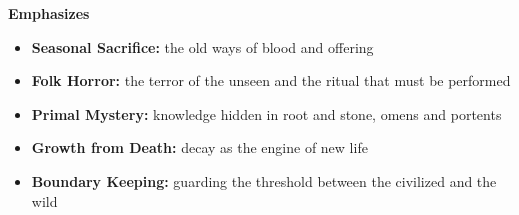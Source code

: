 \noindent\textbf{Emphasizes}
\begin{itemize}
  \item \textbf{Seasonal Sacrifice:} the old ways of blood and offering
  \item \textbf{Folk Horror:} the terror of the unseen and the ritual that must be performed
  \item \textbf{Primal Mystery:} knowledge hidden in root and stone, omens and portents
  \item \textbf{Growth from Death:} decay as the engine of new life
  \item \textbf{Boundary Keeping:} guarding the threshold between the civilized and the wild
\end{itemize}